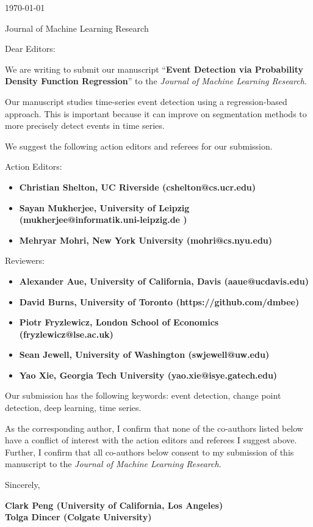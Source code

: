 \documentclass{article}
\newcommand{\red}[1]{\textcolor{BrickRed}{\textbf{#1}}}
\begin{document}
\hfill{\today}

Journal of Machine Learning Research

\bigskip

Dear Editors:

We are writing to submit our manuscript ``\red{Event Detection via Probability Density Function Regression}'' to the \emph{Journal of Machine Learning Research}.

Our manuscript studies time-series event detection using a regression-based approach. This is important because it can improve on segmentation methods to more precisely detect events in time series.

We suggest the following action editors and referees for our submission.

Action Editors:
\begin{itemize}
    \item \red{Christian Shelton, UC Riverside (cshelton@cs.ucr.edu)}
    \item \red{Sayan Mukherjee, University of Leipzig (mukherjee@informatik.uni-leipzig.de )}
    \item \red{Mehryar Mohri, New York University (mohri@cs.nyu.edu)}
\end{itemize}

Reviewers:
\begin{itemize}
    \item \red{Alexander Aue, University of California, Davis (aaue@ucdavis.edu)}
    \item \red{David Burns, University of Toronto (https://github.com/dmbee)}
    \item \red{Piotr Fryzlewicz, London School of Economics (fryzlewicz@lse.ac.uk)}
    \item \red{Sean Jewell, University of Washington (swjewell@uw.edu)}
    \item \red{Yao Xie, Georgia Tech University (yao.xie@isye.gatech.edu)}
\end{itemize}

Our submission has the following keywords: event detection, change point detection, deep learning, time series.

As the corresponding author, I confirm that none of the co-authors listed below have a conflict of interest with the action editors and referees I suggest above. Further, I confirm that all co-authors below consent to my submission of this manuscript to the \emph{Journal of Machine Learning Research}.

\bigskip

Sincerely,

\medskip

\red{Clark Peng (University of California, Los Angeles)}\\
\red{Tolga Dincer (Colgate University)}
\end{document}
